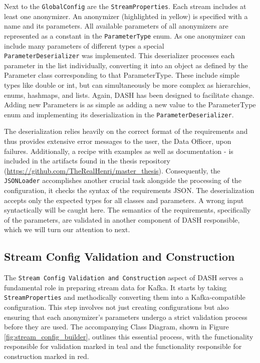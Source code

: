 Next to the \texttt{GlobalConfig} are the \texttt{StreamProperties}. Each stream includes at least one anonymizer. An anonymizer (highlighted in yellow) is specified with a name and its parameters. All available parameters of all anonymizers are represented as a constant in the \texttt{ParameterType} enum. As one anonymizer can include many parameters of different types a special \\ \texttt{ParameterDeserializer} was implemented. This deserializer processes each parameter in the list individually, converting it into an object as defined by the Parameter class corresponding to that ParameterType. These include simple types like double or int, but can simultaneously be more complex as hierarchies, enums, hashmaps, and lists. Again, \ac{DASH} has been designed to facilitate change. Adding new Parameters is as simple as adding a new value to the ParameterType enum and implementing its deserialization in the \texttt{ParameterDeserializer}.\par
The deserialization relies heavily on the correct format of the requirements and thus provides extensive error messages to the user, the Data Officer, upon failures. Additionally, a recipe with examples as well as documentation - is included in the artifacts found in the thesis repository (\url{https://github.com/TheRealHenri/master_thesis}). Consequently, the \texttt{JSONLoader} accomplishes another crucial task alongside the processing of the configuration, it checks the syntax of the requirements JSON. The deserialization accepts only the expected types for all classes and parameters. A wrong input syntactically will be caught here. The semantics of the requirements, specifically of the parameters, are validated in another component of \ac{DASH} responsible, which we will turn our attention to next. 

\subsection{Stream Config Validation and Construction\label{sec:config_builder}}
The \texttt{Stream Config Validation and Construction} aspect of DASH serves a fundamental role in preparing stream data for Kafka. It starts by taking \\ \texttt{StreamProperties} and methodically converting them into a Kafka-compatible configuration. This step involves not just creating configurations but also ensuring that each anonymizer's parameters undergo a strict validation process before they are used. The accompanying Class Diagram, shown in Figure \ref{fig:stream_config_builder}, outlines this essential process, with the functionality responsible for validation marked in teal and the functionality responsible for construction marked in red. \par

